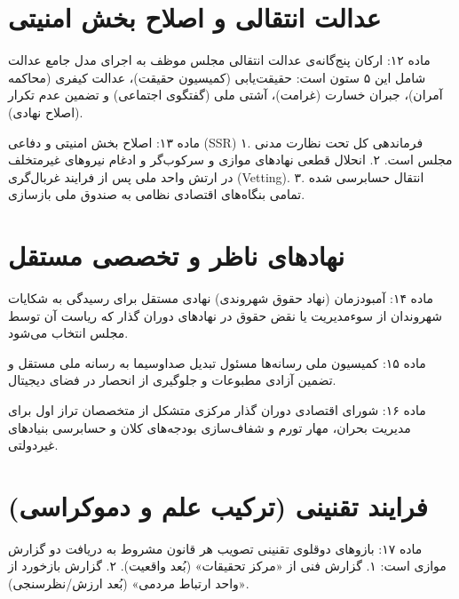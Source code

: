 \documentclass[12pt,a4paper,oneside]{report}
\begin{document}
\chapter{عدالت انتقالی و اصلاح بخش امنیتی}

\begin{articlebox}{ماده ۱۲: ارکان پنج‌گانه‌ی عدالت انتقالی}
مجلس موظف به اجرای مدل جامع عدالت شامل این ۵ ستون است: حقیقت‌یابی (کمیسیون حقیقت)، عدالت کیفری (محاکمه آمران)، جبران خسارت (غرامت)، آشتی ملی (گفتگوی اجتماعی) و تضمین عدم تکرار (اصلاح نهادی).
\end{articlebox}

\begin{articlebox}{ماده ۱۳: اصلاح بخش امنیتی و دفاعی (SSR)}
۱. فرماندهی کل تحت نظارت مدنی مجلس است.
۲. انحلال قطعی نهادهای موازی و سرکوب‌گر و ادغام نیروهای غیرمتخلف در ارتش واحد ملی پس از فرایند غربال‌گری (Vetting).
۳. انتقال حسابرسی شده تمامی بنگاه‌های اقتصادی نظامی به صندوق ملی بازسازی.
\end{articlebox}

\chapter{نهادهای ناظر و تخصصی مستقل}

\begin{articlebox}{ماده ۱۴: آمبودزمان (نهاد حقوق شهروندی)}
نهادی مستقل برای رسیدگی به شکایات شهروندان از سوءمدیریت یا نقض حقوق در نهادهای دوران گذار که ریاست آن توسط مجلس انتخاب می‌شود.
\end{articlebox}

\begin{articlebox}{ماده ۱۵: کمیسیون ملی رسانه‌ها}
مسئول تبدیل صداوسیما به رسانه ملی مستقل و تضمین آزادی مطبوعات و جلوگیری از انحصار در فضای دیجیتال.
\end{articlebox}

\begin{articlebox}{ماده ۱۶: شورای اقتصادی دوران گذار}
مرکزی متشکل از متخصصان تراز اول برای مدیریت بحران، مهار تورم و شفاف‌سازی بودجه‌های کلان و حسابرسی بنیادهای غیردولتی.
\end{articlebox}

\chapter{فرایند تقنینی (ترکیب علم و دموکراسی)}

\begin{articlebox}{ماده ۱۷: بازوهای دوقلوی تقنینی}
تصویب هر قانون مشروط به دریافت دو گزارش موازی است:
۱. گزارش فنی از «مرکز تحقیقات» (بُعد واقعیت).
۲. گزارش بازخورد از «واحد ارتباط مردمی» (بُعد ارزش/نظرسنجی).
\end{articlebox}
\end{document}
